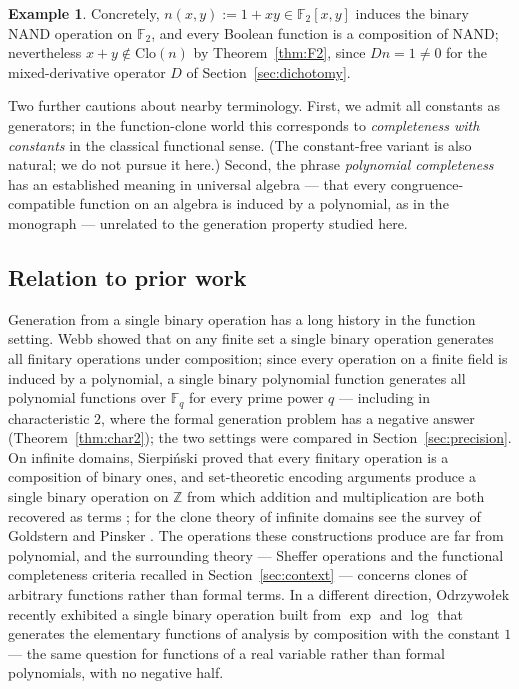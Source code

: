 \documentclass[11pt]{article}
\theoremstyle{definition}
\newtheorem{example}[theorem]{Example}
\theoremstyle{remark}
\newcommand{\F}{\mathbb{F}}
\newcommand{\Z}{\mathbb{Z}}
\newcommand{\Clo}{\mathrm{Clo}}
\begin{document}
\begin{example}\label{ex:nand}
Concretely, $n(x,y) := 1 + xy \in \F_2[x,y]$ induces the binary NAND
operation on $\F_2$, and every Boolean function is a composition of
NAND; nevertheless $x + y \notin \Clo(n)$ by Theorem~\ref{thm:F2},
since $Dn = 1 \neq 0$ for the mixed-derivative operator $D$ of
Section~\ref{sec:dichotomy}.
\end{example}

Two further cautions about nearby terminology.  First, we admit all
constants as generators; in the function-clone world this corresponds
to \emph{completeness with constants} in the classical functional
sense.  (The constant-free variant is also natural; we do not pursue
it here.)  Second, the phrase \emph{polynomial completeness} has an
established meaning in universal algebra --- that every
congruence-compatible function on an algebra is induced by a
polynomial, as in the monograph \cite{KaarliPixley} --- unrelated to
the generation property studied here.

\subsection{Relation to prior work}\label{sec:priorwork}

Generation from a single binary operation has a long history in the
function setting.  Webb \cite{Webb} showed that on any finite set a
single binary operation generates all finitary operations under
composition; since every operation on a finite field is induced by a
polynomial, a single binary polynomial function generates all
polynomial functions over $\F_q$ for every prime power $q$ ---
including in characteristic $2$, where the formal generation problem
has a negative answer (Theorem~\ref{thm:char2}); the two settings
were compared in Section~\ref{sec:precision}.  On infinite domains,
Sierpi\'nski \cite{Sierpinski} proved that every finitary operation
is a composition of binary ones, and set-theoretic encoding
arguments produce a single binary operation on $\Z$ from which
addition and multiplication are both recovered as terms
\cite{HamkinsMO}; for the clone theory of infinite domains see the
survey of Goldstern and Pinsker \cite{GoldsternPinsker}.  The
operations these constructions produce are far from polynomial, and
the surrounding theory --- Sheffer operations and the functional
completeness criteria recalled in Section~\ref{sec:context} ---
concerns clones of arbitrary functions rather than formal terms.  In
a different direction, Odrzywo{\l}ek \cite{Odrzywolek} recently
exhibited a single binary operation built from $\exp$ and $\log$
that generates the elementary functions of analysis by composition
with the constant $1$ --- the same question for functions of a real
variable rather than formal polynomials, with no negative half.
\end{document}
